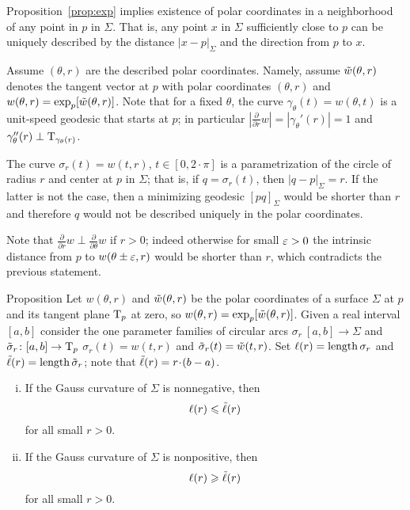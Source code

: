 Proposition~\ref{prop:exp} implies existence of polar coordinates in a neighborhood of any point in $p$ in $\Sigma$.
That is, any point $x$ in $\Sigma$ sufficiently close to $p$ 
can be uniquely described by the distance $|x-p|_\Sigma$ and the direction from $p$ to $x$.

Assume $(\theta,r)$ are the described polar coordinates.
Namely, assume $\~w(\theta,r)$ denotes the tangent vector at $p$ with polar coordinates $(\theta,r)$ and $w( \theta,r)=\exp_p[\~w(\theta,r)]$.
Note that for a fixed $\theta$, the curve $\gamma_\theta(t)=w(\theta,t)$ is a unit-speed geodesic that starts at $p$;
in particular $|\tfrac{\partial}{\partial r}w|=|\gamma_\theta'(r)|=1$ and $\gamma''_\theta(r)\perp\T_{\gamma_\theta(r)}$.

The curve $\sigma_r(t)=w(t,r)$, $t\in[0,2\cdot\pi]$ is a parametrization of the circle of radius $r$ and center at $p$ in $\Sigma$; that is, if $q=\sigma_r(t)$, then $|q-p|_\Sigma=r$.
If the latter is not the case, then a minimizing geodesic $[pq]_\Sigma$ would be shorter than $r$ and therefore $q$ would not be described uniquely in the polar coordinates. 

Note that $\tfrac{\partial}{\partial r}w\perp \tfrac{\partial}{\partial \theta}w$ if $r>0$;
indeed otherwise for small $\eps>0$ the intrinsic distance from $p$ to $w(\theta\pm \eps,r)$ would be shorter than $r$, which contradicts the previous statement.

\begin{thm}{Proposition}
Let $w(\theta,r)$ and $\~w(\theta,r)$ be the polar coordinates of a surface $\Sigma$ at $p$ and its tangent plane $\T_p$ at zero, so $w(\theta,r)\z=\exp_p[\~w(\theta,r)]$.
Given a real interval $[a,b]$ consider the one parameter families of circular arcs $\sigma_r\:[a,b]\to \Sigma$ and $\~\sigma_r\:[a,b]\to \T_p$
$\sigma_r(t)=w(t,r)$ and $\~\sigma_r(t)=\~w(t,r)$.
Set $\ell(r)=\length \sigma_r$ and $\~\ell(r)=\length \~\sigma_r$; note that $\~\ell(r)=r\cdot(b-a)$.

\begin{enumerate}[(i)]
 \item If the Gauss curvature of $\Sigma$ is nonnegative, then 
 \[\ell(r)\le \~\ell(r)\]
 for all small $r>0$.
 \item If the Gauss curvature of $\Sigma$ is nonpositive, then 
 \[\ell(r)\ge \~\ell(r)\]
 for all small $r>0$.
\end{enumerate}

\end{thm}

